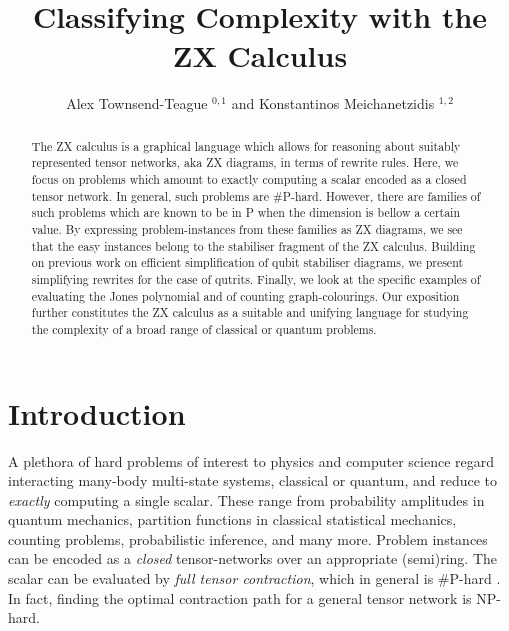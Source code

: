 \documentclass[submission,copyright,creativecommons]{eptcs}
\title{Classifying Complexity with the ZX Calculus}
\author{  Alex Townsend-Teague $^{0,1}$ and Konstantinos Meichanetzidis $^{1,2}$
\institute{$^0$ Mathematical Institute, University of Oxford}
\institute{$^1$ Department of Computer Science, University of Oxford}
\institute{$^2$ Cambridge Quantum Computing Ltd.} }
\begin{document}
\maketitle
\begin{abstract}
The ZX calculus is a graphical language which allows for reasoning about suitably represented tensor networks, aka ZX diagrams,
in terms of rewrite rules.
Here, we focus on problems which amount to exactly computing
a scalar encoded as a closed tensor network.
In general, such problems are \#P-hard.
However, there are families of such problems which are known to be in P
when the dimension is bellow a certain value.
By expressing problem-instances from these families as ZX diagrams,
we see that the easy instances belong to the stabiliser fragment of the ZX calculus.
Building on previous work on efficient simplification of qubit stabiliser diagrams, we present simplifying rewrites for the case of qutrits.
Finally, we look at the specific examples of evaluating the Jones polynomial
and of counting graph-colourings.
Our exposition further constitutes the ZX calculus as a suitable and unifying language for studying the complexity of
a broad range of classical or quantum problems.
\end{abstract}

\section{Introduction}


A plethora of hard problems of interest to physics and computer science
regard interacting many-body multi-state systems, classical or quantum,
and reduce to \emph{exactly} computing a single scalar.
These range from probability amplitudes in quantum mechanics,
partition functions in classical statistical mechanics,
counting problems, probabilistic inference, and many more.
Problem instances can be encoded as a \emph{closed}
tensor-networks over an appropriate (semi)ring.
The scalar can be evaluated by \emph{full tensor contraction},
which in general is \#P-hard \cite{Damm2002}.
In fact, finding the optimal contraction path for a general tensor network is NP-hard.
\end{document}
